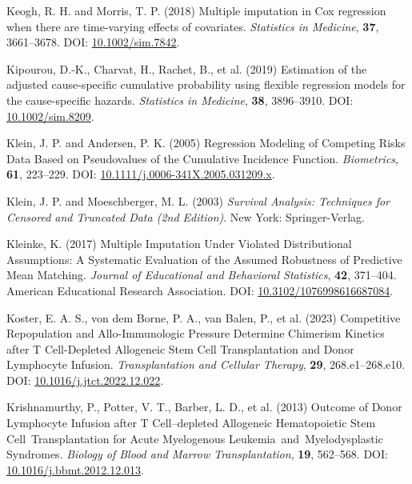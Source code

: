 \documentclass[
  letterpaper,
  paper=240mm:170mm,
  twoside=true,
  open=right,
  fontsize=10pt,
  pagesize=false,
  BCOR=15mm,
  DIV=14,
  headinclude=true,
  footinclude=false,
  headsepline=on]{scrbook}
\newlength{\cslhangindent}
\newenvironment{CSLReferences}[2] %
 {\begin{list}{}{%
  \setlength{\itemindent}{0pt}
  \setlength{\leftmargin}{0pt}
  \setlength{\parsep}{0pt}
  \ifodd #1
   \setlength{\leftmargin}{\cslhangindent}
   \setlength{\itemindent}{-1\cslhangindent}
  \fi
  \setlength{\itemsep}{#2\baselineskip}}}
 {\end{list}}
\begin{document}
\begin{CSLReferences}{1}{1}
Keogh, R. H. and Morris, T. P. (2018) Multiple imputation in {Cox}
regression when there are time-varying effects of covariates.
\emph{Statistics in Medicine}, \textbf{37}, 3661--3678. DOI:
\href{https://doi.org/10.1002/sim.7842}{10.1002/sim.7842}.

Kipourou, D.-K., Charvat, H., Rachet, B., et al. (2019) Estimation of
the adjusted cause-specific cumulative probability using flexible
regression models for the cause-specific hazards. \emph{Statistics in
Medicine}, \textbf{38}, 3896--3910. DOI:
\href{https://doi.org/10.1002/sim.8209}{10.1002/sim.8209}.

Klein, J. P. and Andersen, P. K. (2005) Regression {Modeling} of
{Competing Risks Data Based} on {Pseudovalues} of the {Cumulative
Incidence Function}. \emph{Biometrics}, \textbf{61}, 223--229. DOI:
\href{https://doi.org/10.1111/j.0006-341X.2005.031209.x}{10.1111/j.0006-341X.2005.031209.x}.

Klein, J. P. and Moeschberger, M. L. (2003) \emph{Survival Analysis:
{Techniques} for Censored and Truncated Data (2nd Edition)}. New York:
Springer-Verlag.

Kleinke, K. (2017) Multiple {Imputation Under Violated Distributional
Assumptions}: {A Systematic Evaluation} of the {Assumed Robustness} of
{Predictive Mean Matching}. \emph{Journal of Educational and Behavioral
Statistics}, \textbf{42}, 371--404. American Educational Research
Association. DOI:
\href{https://doi.org/10.3102/1076998616687084}{10.3102/1076998616687084}.

Koster, E. A. S., von dem Borne, P. A., van Balen, P., et al. (2023)
Competitive {Repopulation} and {Allo-Immunologic Pressure Determine
Chimerism Kinetics} after {T Cell-Depleted Allogeneic Stem Cell
Transplantation} and {Donor Lymphocyte Infusion}. \emph{Transplantation
and Cellular Therapy}, \textbf{29}, 268.e1--268.e10. DOI:
\href{https://doi.org/10.1016/j.jtct.2022.12.022}{10.1016/j.jtct.2022.12.022}.

Krishnamurthy, P., Potter, V. T., Barber, L. D., et al. (2013) Outcome
of {Donor Lymphocyte Infusion} after {T Cell}--depleted {Allogeneic
Hematopoietic Stem Cell~Transplantation} for {Acute Myelogenous
Leukemia}~and~{Myelodysplastic Syndromes}. \emph{Biology of Blood and
Marrow Transplantation}, \textbf{19}, 562--568. DOI:
\href{https://doi.org/10.1016/j.bbmt.2012.12.013}{10.1016/j.bbmt.2012.12.013}.


\end{CSLReferences}
\end{document}
